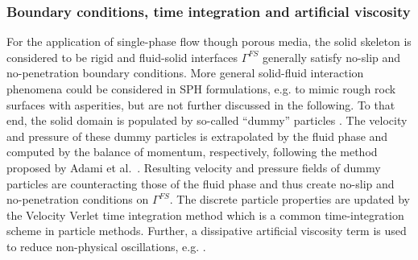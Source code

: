 \subsubsection{Boundary conditions, time integration and artificial viscosity}
For the application of single-phase flow though porous media, the solid skeleton is considered to be rigid and fluid-solid interfaces $\Gamma^{FS}$ generally satisfy no-slip and no-penetration boundary conditions. 
More general solid-fluid interaction phenomena could be considered in SPH formulations, e.g. to mimic rough rock surfaces with asperities, but are not further discussed in the following.
To that end, the solid domain is populated by so-called ``dummy'' particles
\cite{sivanesapillai2016pore,ye-2019}. The velocity and pressure of these dummy particles is extrapolated by the fluid phase and computed by the balance of momentum, respectively, following the method proposed by Adami et al.~\cite{adami2012generalized}. Resulting velocity and pressure fields of dummy particles are counteracting those of the fluid phase and thus create no-slip and no-penetration conditions on $\Gamma^{FS}$. 
The discrete particle properties are updated by the Velocity Verlet time integration method \cite{swope1982computer, verlet1967computer} which is a common time-integration scheme in particle methods. Further, a dissipative artificial viscosity 
term is used to reduce non-physical oscillations, e.g. \cite{monaghan1992smoothed,ye-2019,monaghan2012smoothed}.  
